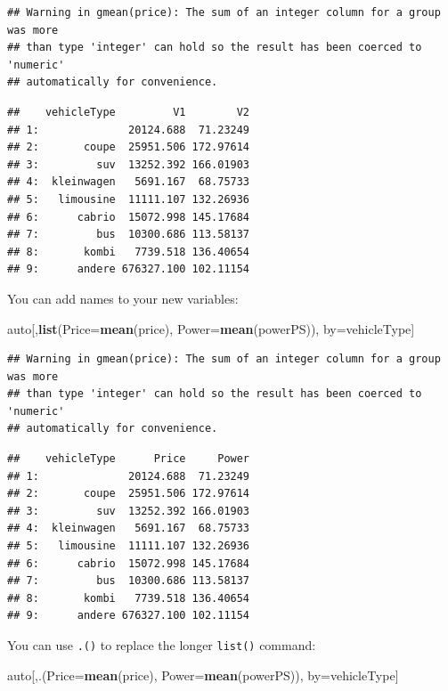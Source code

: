 \documentclass[]{book}
\newenvironment{Shaded}{\begin{snugshade}}{\end{snugshade}}
\newcommand{\KeywordTok}[1]{\textcolor[rgb]{0.13,0.29,0.53}{\textbf{#1}}}
\newcommand{\DataTypeTok}[1]{\textcolor[rgb]{0.13,0.29,0.53}{#1}}
\newcommand{\NormalTok}[1]{#1}
\theoremstyle{definition}
\theoremstyle{definition}
\theoremstyle{definition}
\theoremstyle{remark}
\begin{document}
\begin{verbatim}
## Warning in gmean(price): The sum of an integer column for a group was more
## than type 'integer' can hold so the result has been coerced to 'numeric'
## automatically for convenience.
\end{verbatim}

\begin{verbatim}
##    vehicleType         V1        V2
## 1:              20124.688  71.23249
## 2:       coupe  25951.506 172.97614
## 3:         suv  13252.392 166.01903
## 4:  kleinwagen   5691.167  68.75733
## 5:   limousine  11111.107 132.26936
## 6:      cabrio  15072.998 145.17684
## 7:         bus  10300.686 113.58137
## 8:       kombi   7739.518 136.40654
## 9:      andere 676327.100 102.11154
\end{verbatim}

You can add names to your new variables:

\begin{Shaded}
\begin{Highlighting}[]
\NormalTok{auto[,}\KeywordTok{list}\NormalTok{(}\DataTypeTok{Price=}\KeywordTok{mean}\NormalTok{(price), }\DataTypeTok{Power=}\KeywordTok{mean}\NormalTok{(powerPS)), by=vehicleType]}
\end{Highlighting}
\end{Shaded}

\begin{verbatim}
## Warning in gmean(price): The sum of an integer column for a group was more
## than type 'integer' can hold so the result has been coerced to 'numeric'
## automatically for convenience.
\end{verbatim}

\begin{verbatim}
##    vehicleType      Price     Power
## 1:              20124.688  71.23249
## 2:       coupe  25951.506 172.97614
## 3:         suv  13252.392 166.01903
## 4:  kleinwagen   5691.167  68.75733
## 5:   limousine  11111.107 132.26936
## 6:      cabrio  15072.998 145.17684
## 7:         bus  10300.686 113.58137
## 8:       kombi   7739.518 136.40654
## 9:      andere 676327.100 102.11154
\end{verbatim}

You can use \texttt{.()} to replace the longer \texttt{list()} command:

\begin{Shaded}
\begin{Highlighting}[]
\NormalTok{auto[,.(}\DataTypeTok{Price=}\KeywordTok{mean}\NormalTok{(price), }\DataTypeTok{Power=}\KeywordTok{mean}\NormalTok{(powerPS)), by=vehicleType]}
\end{Highlighting}
\end{Shaded}
\end{document}
